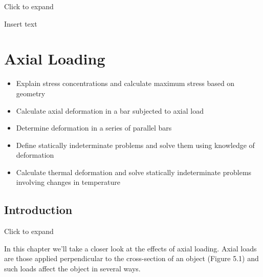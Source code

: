 \documentclass[
  letterpaper,
  DIV=11,
  numbers=noendperiod]{scrreprt}
\providecommand{\tightlist}{%
  \setlength{\itemsep}{0pt}\setlength{\parskip}{0pt}}\usepackage{longtable,booktabs,array}
\begin{document}
Click to expand

Insert text


\chapter{Axial Loading}\label{sec-axial-loading}

\begin{tcolorbox}[enhanced jigsaw, colback=white, colframe=quarto-callout-note-color-frame, leftrule=.75mm, opacitybacktitle=0.6, colbacktitle=quarto-callout-note-color!10!white, arc=.35mm, bottomrule=.15mm, breakable, title={Learning Objectives}, left=2mm, titlerule=0mm, toptitle=1mm, toprule=.15mm, opacityback=0, rightrule=.15mm, coltitle=black, bottomtitle=1mm]

\begin{itemize}
\tightlist
\item
  Explain stress concentrations and calculate maximum stress based on
  geometry
\item
  Calculate axial deformation in a bar subjected to axial load
\item
  Determine deformation in a series of parallel bars
\item
  Define statically indeterminate problems and solve them using
  knowledge of deformation
\item
  Calculate thermal deformation and solve statically indeterminate
  problems involving changes in temperature
\end{itemize}

\end{tcolorbox}

\section*{Introduction}\label{introduction-5}


Click to expand

In this chapter we'll take a closer look at the effects of axial
loading. Axial loads are those applied perpendicular to the
cross-section of an object (Figure 5.1) and such loads affect the object
in several ways.
\end{document}
